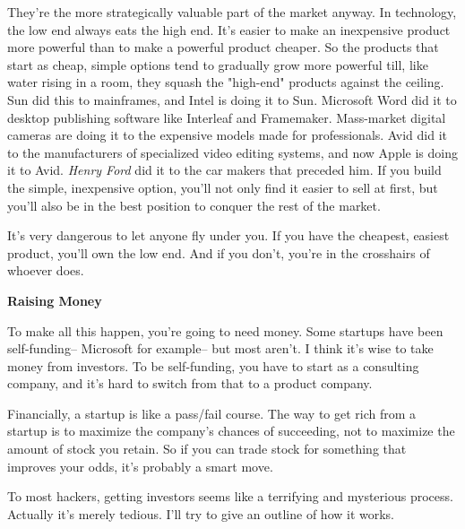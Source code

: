 They're
                    the more strategically valuable part of the market anyway.
                    In technology, the low end always eats the high end. It's
                    easier to make an inexpensive product more powerful than to
                    make a powerful product cheaper. So the products that start
                    as cheap, simple options tend to gradually grow more
                    powerful till, like water rising in a room, they squash the
                    "high-end" products against the ceiling. Sun did this to
                    mainframes, and Intel is doing it to Sun. Microsoft Word did
                    it to desktop publishing software like Interleaf and
                    Framemaker. Mass-market digital cameras are doing it to the
                    expensive models made for professionals. Avid did it to the
                    manufacturers of specialized video editing systems, and now
                    Apple is doing it to Avid. \emph{Henry Ford} did it to the
                    car makers that preceded him. If you build the simple,
                    inexpensive option, you'll not only find it easier to sell
                    at first, but you'll also be in the best position to conquer
                    the rest of the market.

It's very dangerous to
                    let anyone fly under you. If you have the cheapest, easiest
                    product, you'll own the low end. And if you don't, you're in
                    the crosshairs of whoever does.

\textbf{Raising Money}

To make all this happen, you're going to need
                    money. Some startups have been self-funding-- Microsoft for
                    example-- but most aren't. I think it's wise to take money
                    from investors. To be self-funding, you have to start as a
                    consulting company, and it's hard to switch from that to a
                    product company.

Financially, a startup is like a
                    pass/fail course. The way to get rich from a startup is to
                    maximize the company's chances of succeeding, not to
                    maximize the amount of stock you retain. So if you can trade
                    stock for something that improves your odds, it's probably a
                    smart move.

To most hackers, getting investors
                    seems like a terrifying and mysterious process. Actually
                    it's merely tedious. I'll try to give an outline of how it
                    works.

